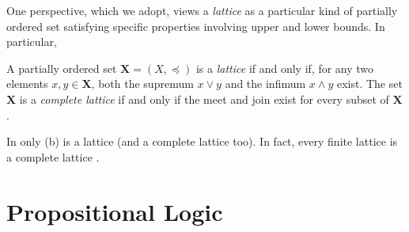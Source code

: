 One perspective, which we adopt, views a \textit{lattice} as a particular kind of partially ordered set satisfying specific properties involving upper and lower bounds. In particular,

\begin{definition}
  \label{definition:complete-lattice}
  A partially ordered set $\mathbf{X} = (X, \preceq)$ is a \textit{lattice} if and only if, for any two elements $x, y \in \mathbf{X}$, both the supremum $x \vee y$ and the infimum $x \wedge y$ exist. The set $\mathbf{X}$ is a \textit{complete lattice} if and only if the meet and join exist for every subset of $\mathbf{X}$.
\end{definition}

In  only (b) is a lattice (and a complete lattice too). In fact, every finite lattice is a complete lattice \cite{ganter1999formal}.

\section{Propositional Logic}
\label{section:propositional-logic}
